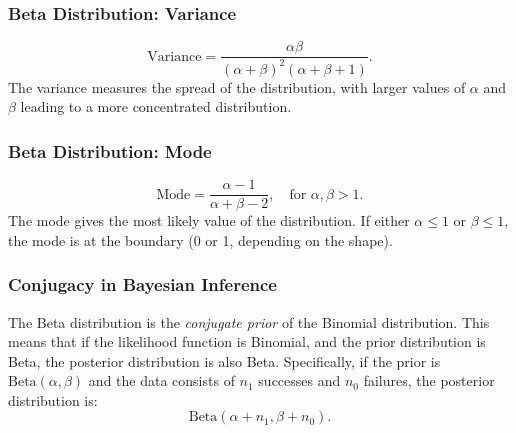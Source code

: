 \subsubsection{Beta Distribution: Variance} 
\[
    \text{Variance} = \frac{\alpha \beta}{(\alpha + \beta)^2 (\alpha + \beta + 1)}.
\]
The variance measures the spread of the distribution, with larger values of \(\alpha\) and \(\beta\) leading to a more concentrated distribution.





\subsubsection{Beta Distribution: Mode}
\[
    \text{Mode} = \frac{\alpha - 1}{\alpha + \beta - 2}, \quad \text{for } \alpha, \beta > 1.
\]
The mode gives the most likely value of the distribution. If either \(\alpha \leq 1\) or \(\beta \leq 1\), the mode is at the boundary (0 or 1, depending on the shape).

\subsubsection{Conjugacy in Bayesian Inference}

The Beta distribution is the \textit{conjugate prior} of the Binomial distribution. This means that if the likelihood function is Binomial, and the prior distribution is Beta, the posterior distribution is also Beta. Specifically, if the prior is \(\text{Beta}(\alpha, \beta)\) and the data consists of \(n_1\) successes and \(n_0\) failures, the posterior distribution is:
\[
    \text{Beta}(\alpha + n_1, \beta + n_0).
\]

